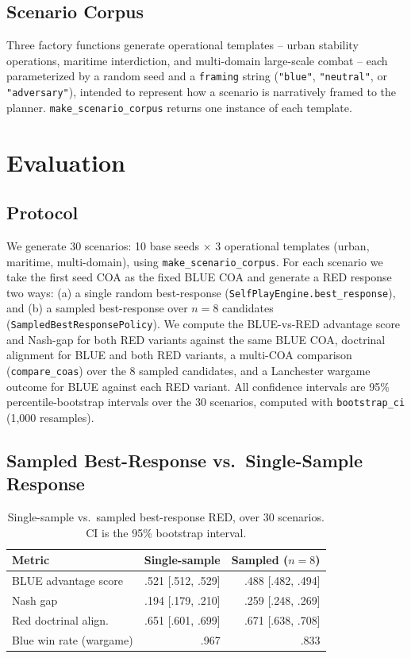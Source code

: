 \documentclass[sigconf]{acmart}
\begin{document}
\subsection{Scenario Corpus}

Three factory functions generate operational templates -- urban stability operations, maritime interdiction, and multi-domain large-scale combat -- each parameterized by a random seed and a \texttt{framing} string (\texttt{"blue"}, \texttt{"neutral"}, or \texttt{"adversary"}), intended to represent how a scenario is narratively framed to the planner. \texttt{make\_scenario\_corpus} returns one instance of each template.

\section{Evaluation}

\subsection{Protocol}

We generate 30 scenarios: 10 base seeds $\times$ 3 operational templates (urban, maritime, multi-domain), using \texttt{make\_scenario\_corpus}. For each scenario we take the first seed COA as the fixed BLUE COA and generate a RED response two ways: (a) a single random best-response (\texttt{SelfPlayEngine.best\_response}), and (b) a sampled best-response over $n=8$ candidates (\texttt{SampledBestResponsePolicy}). We compute the BLUE-vs-RED advantage score and Nash-gap for both RED variants against the same BLUE COA, doctrinal alignment for BLUE and both RED variants, a multi-COA comparison (\texttt{compare\_coas}) over the 8 sampled candidates, and a Lanchester wargame outcome for BLUE against each RED variant. All confidence intervals are 95\% percentile-bootstrap intervals over the 30 scenarios, computed with \texttt{bootstrap\_ci} (1{,}000 resamples).

\subsection{Sampled Best-Response vs.\ Single-Sample Response}

\begin{table}[t]
\caption{Single-sample vs.\ sampled best-response RED, over 30 scenarios. CI is the 95\% bootstrap interval.}
\label{tab:main}
\small
\begin{tabular}{lrr}
\toprule
Metric & Single-sample & Sampled ($n{=}8$) \\
\midrule
BLUE advantage score & .521 [.512, .529] & .488 [.482, .494] \\
Nash gap & .194 [.179, .210] & .259 [.248, .269] \\
Red doctrinal align. & .651 [.601, .699] & .671 [.638, .708] \\
Blue win rate (wargame) & .967 & .833 \\
\bottomrule
\end{tabular}
\end{table}
\end{document}
